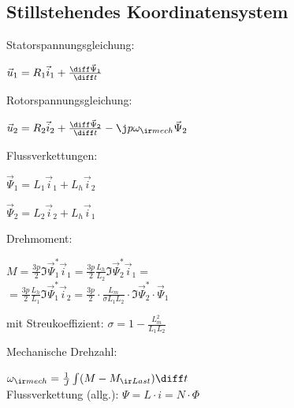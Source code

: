 \documentclass[german]{latex4ei_fs}
\begin{document}
\begin{sectionbox}
\subsection{Stillstehendes Koordinatensystem}



Statorspannungsgleichung:

$\vec u_1 = R_1 \vec i_1 + \frac{\diff \vec \Psi_1}{\diff t}$ 

Rotorspannungsgleichung: 

$\vec u_2 = R_2 \vec i_2 + \frac{\diff \vec \Psi_2}{\diff t}  - \j p \omega_{\ir mech} \vec \Psi_2$

Flussverkettungen: 

$\vec \Psi_1 = L_1 \vec i_1 + L_h \vec i_2$

$\vec \Psi_2  = L_2 \vec i_2 + L_h \vec i_1$


Drehmoment:

$M = \frac{3p}{2} \Im{\vec \Psi_1^* \vec i_1} = \frac{3p}{2} \frac{L_h}{L_2} \Im{\vec \Psi_2^* \vec i_1} = $ \\ $ = \frac{3p}{2} \frac{L_h}{L_1} \Im{\vec \Psi_1^* \vec i_2} = \frac{3p}{2} \cdot \frac{L_m}{\sigma L_1 L_2} \cdot \Im{\vec \Psi_2^* \cdot \vec \Psi_1}$ 

mit Streukoeffizient: $\sigma = 1 - \frac{L_m^2}{L_1 L_2}$


Mechanische Drehzahl: 

$\omega_{\ir mech} = \frac{1}{J} \int (M - M_{\ir Last}) \diff t$ \\

Flussverkettung (allg.): $\Psi = L \cdot i = N \cdot \Phi$
\end{sectionbox}
\end{document}
